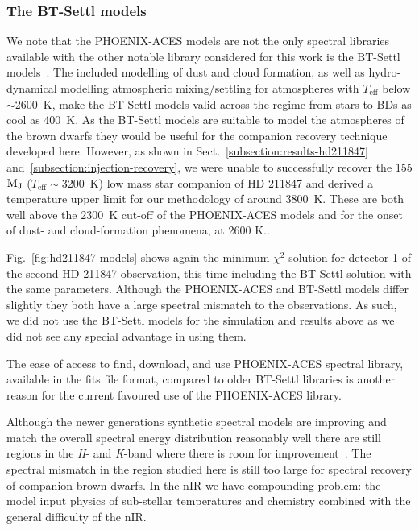 \documentclass[fleqn,usenatbib]{mnras}
\begin{document}
\subsubsection{The {BT-Settl} models}
\label{subsubsec:BT-Settl}
We note that the PHOENIX-ACES models are not the only spectral libraries available with the other notable library considered for this work is the {BT-Settl} models~\citep{allard_model_2010,allard_btsettl_2013,baraffe_new_2015}. The included modelling of dust and cloud formation, as well as hydro-dynamical modelling atmospheric mixing/settling for atmospheres with \(T_{\textrm{eff}}\) below \(\sim\)2600~K, make the {BT-Settl} models valid across the regime from stars to BDs as cool as 400~K. As the {BT-Settl} models are suitable to model the atmospheres of the brown dwarfs they would be useful for the companion recovery technique developed here. However, as shown in Sect.~\ref{subsection:results-hd211847} and~\ref{subsection:injection-recovery}, we were unable to successfully recover the 155 \(\rm M_J\) (\(T_{\textrm{eff}}\sim\)3200~K) low mass star companion of {HD 211847} and derived a temperature upper limit for our methodology of around 3800~K. These are both well above the 2300~K cut-off of the PHOENIX-ACES models and for the onset of dust- and cloud-formation phenomena, at 2600 K..

Fig.~\ref{fig:hd211847-models} shows again the minimum \(\chi^2\) solution for detector 1 of the second {HD 211847} observation, this time including the {BT-Settl} solution with the same parameters. Although the PHOENIX-ACES and {BT-Settl} models differ slightly they both have a large spectral mismatch to the observations. As such, we did not use the {BT-Settl} models for the simulation and results above as we did not see any special advantage in using them.

The ease of access to find, download, and use PHOENIX-ACES spectral library, available in the fits file format, compared to older {BT-Settl} libraries is another reason for the current favoured use of the PHOENIX-ACES library.

Although the newer generations synthetic spectral models are improving and match the overall spectral energy distribution reasonably well there are still regions in the \textit{H}- and \textit{K}-band where there is room for improvement~\citet{rajpurohit_spectral_2016}. The spectral mismatch in the region studied here is still too large for spectral recovery of companion brown dwarfs. In the nIR we have compounding problem: the model input physics of sub-stellar temperatures and chemistry combined with the general difficulty of the nIR.
\end{document}
